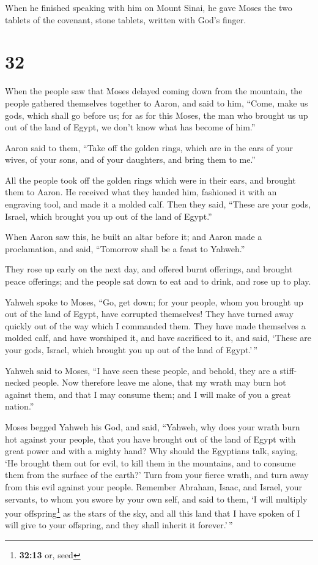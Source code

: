  When he finished speaking with him on Mount Sinai, he
gave Moses the two tablets of the covenant, stone tablets, written with
God's finger.

\hypertarget{section-31}{%
\section{32}\label{section-31}}

 When the people saw that Moses delayed coming down from
the mountain, the people gathered themselves together to Aaron, and said
to him, ``Come, make us gods, which shall go before us; for as for this
Moses, the man who brought us up out of the land of Egypt, we don't know
what has become of him.''

 Aaron said to them, ``Take off the golden rings, which
are in the ears of your wives, of your sons, and of your daughters, and
bring them to me.''

 All the people took off the golden rings which were in
their ears, and brought them to Aaron.  He received what
they handed him, fashioned it with an engraving tool, and made it a
molded calf. Then they said, ``These are your gods, Israel, which
brought you up out of the land of Egypt.''

 When Aaron saw this, he built an altar before it; and
Aaron made a proclamation, and said, ``Tomorrow shall be a feast to
Yahweh.''

 They rose up early on the next day, and offered burnt
offerings, and brought peace offerings; and the people sat down to eat
and to drink, and rose up to play.

 Yahweh spoke to Moses, ``Go, get down; for your people,
whom you brought up out of the land of Egypt, have corrupted themselves!
 They have turned away quickly out of the way which I
commanded them. They have made themselves a molded calf, and have
worshiped it, and have sacrificed to it, and said, `These are your gods,
Israel, which brought you up out of the land of Egypt.'\,''

 Yahweh said to Moses, ``I have seen these people, and
behold, they are a stiff-necked people.  Now therefore
leave me alone, that my wrath may burn hot against them, and that I may
consume them; and I will make of you a great nation.''

 Moses begged Yahweh his God, and said, ``Yahweh, why
does your wrath burn hot against your people, that you have brought out
of the land of Egypt with great power and with a mighty hand?
 Why should the Egyptians talk, saying, `He brought them
out for evil, to kill them in the mountains, and to consume them from
the surface of the earth?' Turn from your fierce wrath, and turn away
from this evil against your people.  Remember Abraham,
Isaac, and Israel, your servants, to whom you swore by your own self,
and said to them, `I will multiply your offspring\footnote{\textbf{32:13}
  or, seed} as the stars of the sky, and all this land that I have
spoken of I will give to your offspring, and they shall inherit it
forever.'\,''

